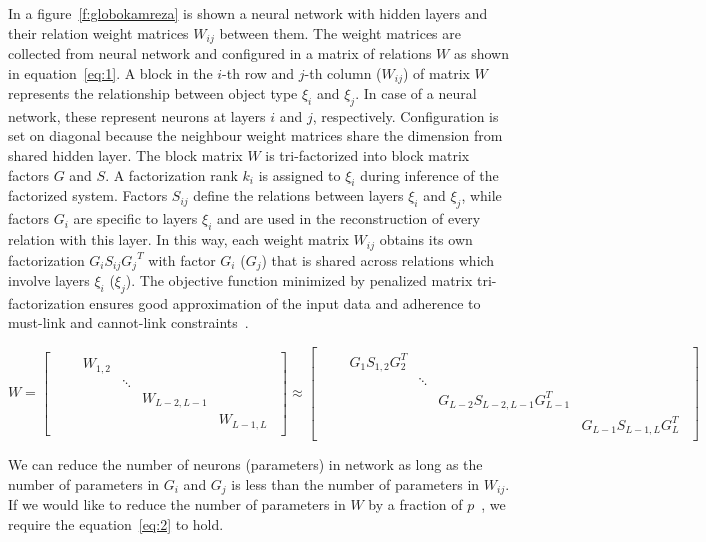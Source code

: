 \documentclass{article} %
\begin{document}
In a figure~\ref{f:globokamreza} is shown a neural network with hidden
layers and their relation weight matrices $W_{ij}$ between them. The weight
matrices are collected from neural network and configured in a matrix of
relations $W$ as shown in equation~\ref{eq:1}. A block in the $i$-th
row and $j$-th column ($W_{ij}$) of matrix $W$ represents the relationship
between object type $\xi_i$ and $\xi_j$. In case of a neural network, these
represent neurons at layers $i$ and $j$, respectively. Configuration is set on
diagonal because the neighbour weight matrices share the dimension from shared
hidden layer. The block matrix $W$ is
tri-factorized into block matrix factors $G$ and $S$. A factorization rank
$k_i$ is assigned to $\xi_i$ during inference of the factorized system. Factors
$S_{ij}$ define the relations between layers $\xi_i$ and $\xi_j$, while
factors $G_i$ are specific to layers $\xi_i$ and are used in the
reconstruction of every relation with this layer. In this way, each
weight matrix $W_{ij}$ obtains its own factorization $G_i S_{ij} {G_j}^T$ with
factor $G_i$ ($G_j$) that is shared across relations which involve layers
$\xi_i$ ($\xi_j$). The objective function minimized by penalized matrix
tri-factorization ensures good approximation of the input data and adherence to
must-link and cannot-link constraints~\cite{zitnik2015data}.

\begin{equation} \label{eq:1}
W = 
\begin{bmatrix} 
\begin{smallmatrix}
& &W_{1,2} & & & \\
& & &\ddots & & \\ 
& & & &W_{L-2,L-1} & \\ 
& & & & &W_{L-1,L} 
\end{smallmatrix}
\end{bmatrix} 
\approx 
\begin{bmatrix} 
\begin{smallmatrix}
& &G_1S_{1,2}G_2^T & & & \\ 
& & &\ddots & & \\ 
& & & &G_{L-2}S_{L-2,L-1}G_{L-1}^T & \\ 
& & & & &G_{L-1}S_{L-1,L}G_L^T 
\end{smallmatrix}
\end{bmatrix}
\end{equation}


We can reduce
the number of neurons (parameters) in network as long as the number of 
parameters
in $G_i$ and $G_j$ is less than the number of parameters in $W_{ij}$. If we 
would
like to reduce the number of parameters in $W$ by a fraction of
$p$~\cite{sainath2013low}, we require the equation~\ref{eq:2} to hold.
\end{document}
